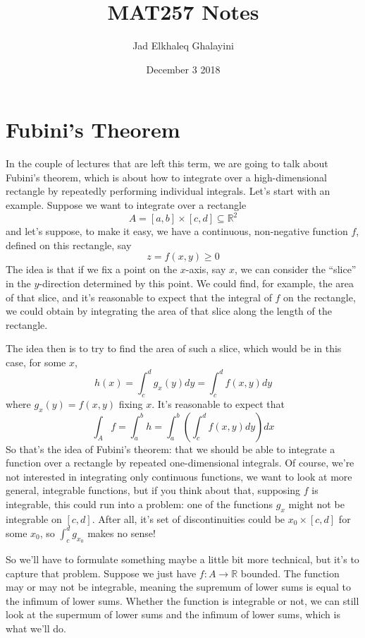 \documentclass{article}
\title{MAT257 Notes}
\author{Jad Elkhaleq Ghalayini}
\date{December 3 2018}
\newcommand{\reals}[0]{\mathbb{R}}
\begin{document}
\maketitle

\section{Fubini's Theorem}

In the couple of lectures that are left this term, we are going to talk about Fubini's theorem, which is about how to integrate over a high-dimensional rectangle by repeatedly performing individual integrals. Let's start with an example. Suppose we want to integrate over a rectangle \[A = [a, b] \times [c, d] \subseteq \reals^2\]
and let's suppose, to make it easy, we have a continuous, non-negative function \(f\), defined on this rectangle, say
\[z = f(x, y) \geq 0\]
The idea is that if we fix a point on the \(x\)-axis, say \(x\), we can consider the ``slice'' in the \(y\)-direction determined by this point. We could find, for example, the area of that slice, and it's reasonable to expect that the integral of \(f\) on the rectangle, we could obtain by integrating the area of that slice along the length of the rectangle.

The idea then is to try to find the area of such a slice, which would be in this case, for some \(x\),
\[h(x) = \int_c^dg_x(y)dy = \int_c^df(x, y)dy\]
where \(g_x(y) = f(x, y)\) fixing \(x\). It's reasonable to expect that
\[\int_Af = \int_a^bh = \int_a^b\left(\int_c^df(x, y)dy\right)dx\]
So that's the idea of Fubini's theorem: that we should be able to integrate a function over a rectangle by repeated one-dimensional integrals. Of course, we're not interested in integrating only continuous functions, we want to look at more general, integrable functions, but if you think about that, supposing \(f\) is integrable, this could run into a problem: one of the functions \(g_x\) might not be integrable on \([c, d]\). After all, it's set of discontinuities could be \(x_0 \times [c, d]\) for some \(x_0\), so \(\int_c^dg_{x_0}\) makes no sense!

So we'll have to formulate something maybe a little bit more technical, but it's to capture that problem. Suppose we just have \(f: A \to \reals\) bounded. The function may or may not be integrable, meaning the supremum of lower sums is equal to the infimum of lower sums. Whether the function is integrable or not, we can still look at the supermum of lower sums and the infimum of lower sums, which is what we'll do.
\end{document}
